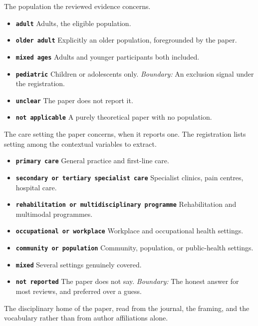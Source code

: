 \documentclass[11pt]{article}
\begin{document}
\begin{description}
\begin{itemize}[leftmargin=1.3em,itemsep=2pt,topsep=2pt]
  \end{itemize}
\item[\texttt{population}] The population the reviewed evidence concerns.
  \begin{itemize}[leftmargin=1.3em,itemsep=2pt,topsep=2pt]
  \item \textbf{\texttt{adult}} Adults, the eligible population.
  \item \textbf{\texttt{older adult}} Explicitly an older population, foregrounded by the paper.
  \item \textbf{\texttt{mixed ages}} Adults and younger participants both included.
  \item \textbf{\texttt{pediatric}} Children or adolescents only. {\small \textit{Boundary:} An exclusion signal under the registration.}
  \item \textbf{\texttt{unclear}} The paper does not report it.
  \item \textbf{\texttt{not applicable}} A purely theoretical paper with no population.
  \end{itemize}
\item[\texttt{care\_setting}] The care setting the paper concerns, when it reports one. The registration lists setting among the contextual variables to extract.
  \begin{itemize}[leftmargin=1.3em,itemsep=2pt,topsep=2pt]
  \item \textbf{\texttt{primary care}} General practice and first-line care.
  \item \textbf{\texttt{secondary or tertiary specialist care}} Specialist clinics, pain centres, hospital care.
  \item \textbf{\texttt{rehabilitation or multidisciplinary programme}} Rehabilitation and multimodal programmes.
  \item \textbf{\texttt{occupational or workplace}} Workplace and occupational health settings.
  \item \textbf{\texttt{community or population}} Community, population, or public-health settings.
  \item \textbf{\texttt{mixed}} Several settings genuinely covered.
  \item \textbf{\texttt{not reported}} The paper does not say. {\small \textit{Boundary:} The honest answer for most reviews, and preferred over a guess.}
  \end{itemize}
\item[\texttt{primary\_discipline}] The disciplinary home of the paper, read from the journal, the framing, and the vocabulary rather than from author affiliations alone.

\end{description}
\end{document}
